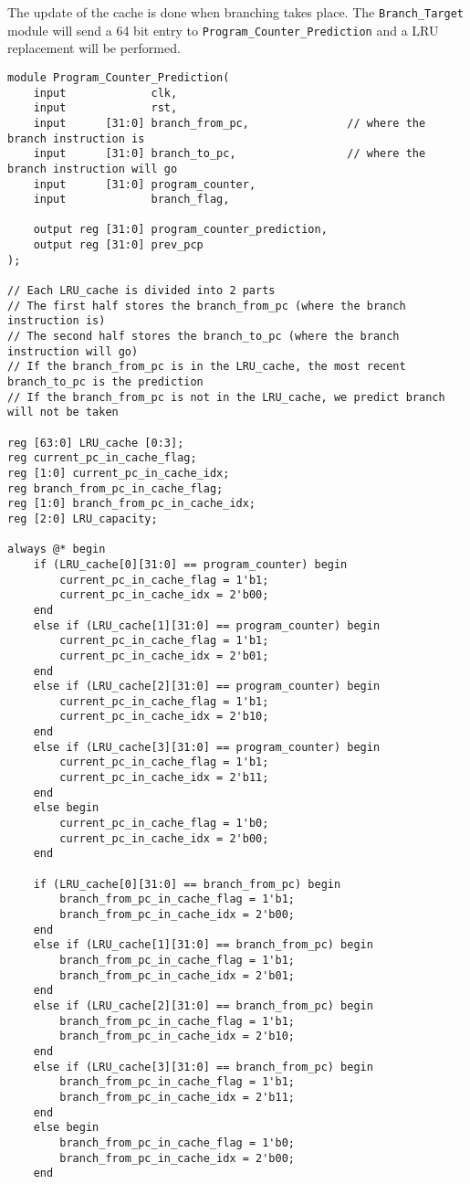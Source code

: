 \documentclass[a4paper,12pt]{article}
\begin{document}
The update of the cache is done when branching takes place. The \texttt{Branch\_Target} module will send a 64 bit entry to \texttt{Program\_Counter\_Prediction} and a LRU replacement will be performed.

\newpage
\begin{verbatim}
module Program_Counter_Prediction(
    input             clk,
    input             rst,
    input      [31:0] branch_from_pc,               // where the branch instruction is
    input      [31:0] branch_to_pc,                 // where the branch instruction will go
    input      [31:0] program_counter,
    input             branch_flag,
    
    output reg [31:0] program_counter_prediction,
    output reg [31:0] prev_pcp
);

// Each LRU_cache is divided into 2 parts
// The first half stores the branch_from_pc (where the branch instruction is)
// The second half stores the branch_to_pc (where the branch instruction will go)
// If the branch_from_pc is in the LRU_cache, the most recent branch_to_pc is the prediction
// If the branch_from_pc is not in the LRU_cache, we predict branch will not be taken

reg [63:0] LRU_cache [0:3];
reg current_pc_in_cache_flag;
reg [1:0] current_pc_in_cache_idx;
reg branch_from_pc_in_cache_flag;
reg [1:0] branch_from_pc_in_cache_idx;
reg [2:0] LRU_capacity;

always @* begin
    if (LRU_cache[0][31:0] == program_counter) begin
        current_pc_in_cache_flag = 1'b1;
        current_pc_in_cache_idx = 2'b00;
    end
    else if (LRU_cache[1][31:0] == program_counter) begin
        current_pc_in_cache_flag = 1'b1;
        current_pc_in_cache_idx = 2'b01;
    end
    else if (LRU_cache[2][31:0] == program_counter) begin
        current_pc_in_cache_flag = 1'b1;
        current_pc_in_cache_idx = 2'b10;
    end
    else if (LRU_cache[3][31:0] == program_counter) begin
        current_pc_in_cache_flag = 1'b1;
        current_pc_in_cache_idx = 2'b11;
    end
    else begin
        current_pc_in_cache_flag = 1'b0;
        current_pc_in_cache_idx = 2'b00;
    end

    if (LRU_cache[0][31:0] == branch_from_pc) begin
        branch_from_pc_in_cache_flag = 1'b1;
        branch_from_pc_in_cache_idx = 2'b00;
    end
    else if (LRU_cache[1][31:0] == branch_from_pc) begin
        branch_from_pc_in_cache_flag = 1'b1;
        branch_from_pc_in_cache_idx = 2'b01;
    end
    else if (LRU_cache[2][31:0] == branch_from_pc) begin
        branch_from_pc_in_cache_flag = 1'b1;
        branch_from_pc_in_cache_idx = 2'b10;
    end
    else if (LRU_cache[3][31:0] == branch_from_pc) begin
        branch_from_pc_in_cache_flag = 1'b1;
        branch_from_pc_in_cache_idx = 2'b11;
    end
    else begin
        branch_from_pc_in_cache_flag = 1'b0;
        branch_from_pc_in_cache_idx = 2'b00;
    end


\end{verbatim}
\end{document}
